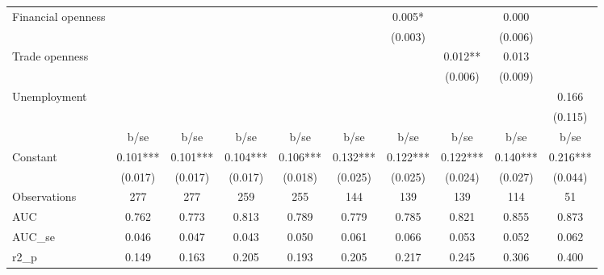 \begin{tabular}{l*{9}{c}}
Financial openness              &               &               &               &               &               &       0.005*  &               &       0.000   &               \\
                                &               &               &               &               &               &     (0.003)   &               &     (0.006)   &               \\
Trade openness                  &               &               &               &               &               &               &       0.012** &       0.013   &               \\
                                &               &               &               &               &               &               &     (0.006)   &     (0.009)   &               \\
Unemployment                    &               &               &               &               &               &               &               &               &       0.166   \\
                                &               &               &               &               &               &               &               &               &     (0.115)   \\


                                &        b/se   &        b/se   &        b/se   &        b/se   &        b/se   &        b/se   &        b/se   &        b/se   &        b/se   \\
\hline
Constant                        &       0.101***&       0.101***&       0.104***&       0.106***&       0.132***&       0.122***&       0.122***&       0.140***&       0.216***\\
                                &     (0.017)   &     (0.017)   &     (0.017)   &     (0.018)   &     (0.025)   &     (0.025)   &     (0.024)   &     (0.027)   &     (0.044)   \\


\hline
\hline
Observations                    &      277         &      277         &      259         &      255         &      144         &      139         &      139         &      114         &       51         \\
AUC                             &    0.762         &    0.773         &    0.813         &    0.789         &    0.779         &    0.785         &    0.821         &    0.855         &    0.873         \\
AUC\_se                          &    0.046         &    0.047         &    0.043         &    0.050         &    0.061         &    0.066         &    0.053         &    0.052         &    0.062         \\
r2\_p                            &    0.149         &    0.163         &    0.205         &    0.193         &    0.205         &    0.217         &    0.245         &    0.306         &    0.400         \\
\end{tabular}

